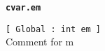 {\tt \bf cvar.em }
\\
\makebox[0.5in]{}\begin{minipage}[t]{6in}
{\tt [ Global : int  em ]  }\\
   Comment for m   
\\

\end{minipage}\\



